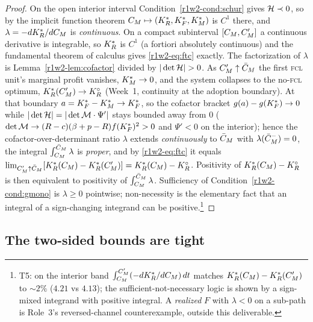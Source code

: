 \begin{proof}
On the open interior interval Condition~\ref{r1w2-cond:schur} gives $\mathcal H\prec0$, so by
the implicit function theorem $C_M\mapsto(K_R^{*},K_F^{*},K_M^{*})$ is $C^{1}$ there, and
$\lambda=-dK_R^{*}/dC_M$ is \emph{continuous}. On a compact subinterval $[C_M,C_M']$ a
continuous derivative is integrable, so $K_R^{*}$ is $C^{1}$ (a fortiori absolutely
continuous) and the fundamental theorem of calculus gives \eqref{r1w2-eq:ftc} exactly.
The factorization of $\lambda$ is Lemma~\ref{r1w2-lem:cofactor} divided by
$|\det\Hcal|>0$. As $C_M'\uparrow\bar C_M$ the first \textsc{fcl} unit's marginal
profit vanishes, $K_M^{*}\to0$, and the system collapses to the no-\textsc{fcl}
optimum, $K_R^{*}(C_M')\to K_R^{\circ}$ (Week~1, continuity at the adoption boundary). At that
boundary $a=K_F^{*}-K_M^{*}\to K_F^{*}$, so the cofactor bracket $g(a)-g(K_F^{*})\to0$ while
$|\det\mathcal H|=|\det\mathcal M\cdot\Psi'|$ stays bounded away from $0$
($\det\mathcal M\to(R-c)(\beta+p-R)f(K_F^{*})^2>0$ and $\Psi'<0$ on the interior); hence
the cofactor-over-determinant ratio $\lambda$ extends \emph{continuously} to
$\bar C_M$ with $\lambda(\bar C_M^-)=0$, the
integral $\int_{C_M}^{\bar C_M}\lambda$ is \emph{proper}, and by \eqref{r1w2-eq:ftc} it
equals $\lim_{C_M'\uparrow\bar C_M}[K_R^{*}(C_M)-K_R^{*}(C_M')]=K_R^{*}(C_M)-K_R^{\circ}$. Positivity of
$K_R^{*}(C_M)-K_R^{\circ}$ is then equivalent to positivity of $\int_{C_M}^{\bar C_M}\lambda$.
Sufficiency of Condition~\ref{r1w2-cond:gmono} is $\lambda\ge0$ pointwise; non-necessity
is the elementary fact that an integral of a sign-changing integrand can be
positive.\footnote{T5: on the interior band $\int_{C_M}^{C_M'}(-dK_R^{*}/dC_M)\,dt$
matches $K_R^{*}(C_M)-K_R^{*}(C_M')$ to $\sim2\%$ ($4.21$ vs $4.13$); the
sufficient-not-necessary logic is shown by a sign-mixed integrand with positive
integral. A \emph{realized} $F$ with $\lambda<0$ on a sub-path is Role~3's
reversed-channel counterexample, outside this deliverable.}
\end{proof}

\subsection{The two-sided bounds are tight}

